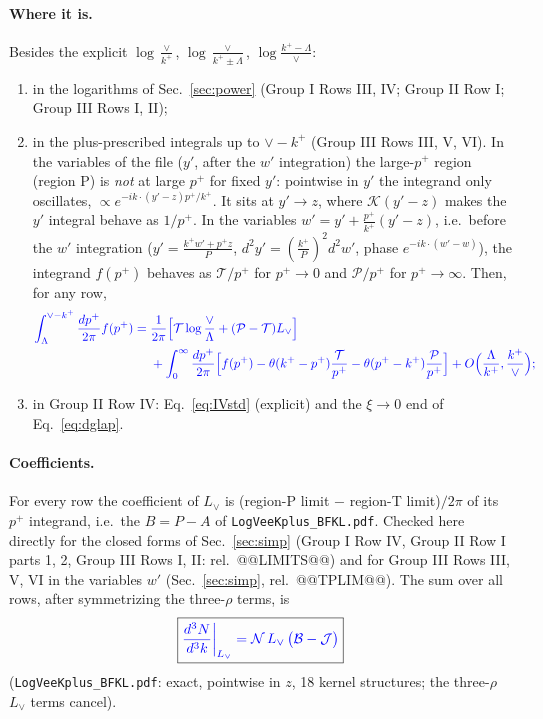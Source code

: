 \documentclass[10pt]{article}
\numberwithin{equation}{section}
\newcommand{\new}[1]{{\color{blue}#1}}
\newcommand{\Lv}{L_{\vee}}
\newcommand{\KK}{\mathcal K}
\newcommand{\JJ}{\mathcal J}
\newcommand{\BB}{\mathcal B}
\newcommand{\NN}{\mathcal N}
\begin{document}
\paragraph{Where it is.} Besides the explicit $\log\frac{\vee}{k^+}$, $\log\frac{\vee}{k^+\pm\Lambda}$, $\log\frac{k^+-\Lambda}{\vee}$:
\begin{enumerate}
\item in the logarithms of Sec.~\ref{sec:power} (Group I Rows III, IV; Group II Row I; Group III Rows I, II);
\item in the plus-prescribed integrals up to $\vee-k^+$ (Group III Rows III, V, VI). In the variables of the file ($y'$, after the $w'$ integration) the large-$p^+$ region (region P) is \emph{not} at large $p^+$ for fixed $y'$: pointwise in $y'$ the integrand only oscillates, $\propto e^{-ik\cdot(y'-z)p^+/k^+}$. It sits at $y'\to z$, where $\KK(y'-z)$ makes the $y'$ integral behave as $1/p^+$. In the variables $w'=y'+\frac{p^+}{k^+}(y'-z)$, i.e.\ before the $w'$ integration ($y'=\frac{k^+w'+p^+z}{P}$, $d^2y'=(\frac{k^+}{P})^2d^2w'$, phase $e^{-ik\cdot(w'-w)}$), the integrand $f(p^+)$ behaves as $\mathcal T/p^+$ for $p^+\to0$ and $\mathcal P/p^+$ for $p^+\to\infty$. Then, for any row,
\begin{equation}
\new{\begin{aligned}\int_\Lambda^{\vee-k^+}\frac{dp^+}{2\pi}f(p^+)={}&\frac{1}{2\pi}\Big[\mathcal T\log\frac{\vee}{\Lambda}+(\mathcal P-\mathcal T)\Lv\Big]\\&+\int_0^{\infty}\frac{dp^+}{2\pi}\Big[f(p^+)-\theta(k^+-p^+)\frac{\mathcal T}{p^+}-\theta(p^+-k^+)\frac{\mathcal P}{p^+}\Big]+O\Big(\frac{\Lambda}{k^+},\frac{k^+}{\vee}\Big);\end{aligned}}
\label{eq:plusrule}
\end{equation}
\item in Group II Row IV: Eq.~\eqref{eq:IVstd} (explicit) and the $\xi\to0$ end of Eq.~\eqref{eq:dglap}.
\end{enumerate}
\paragraph{Coefficients.} For every row the coefficient of $\Lv$ is (region-P limit $-$ region-T limit)$/2\pi$ of its $p^+$ integrand, i.e.\ the $B=P-A$ of \texttt{LogVeeKplus\_BFKL.pdf}. Checked here directly for the closed forms of Sec.~\ref{sec:simp} (Group I Row IV, Group II Row I parts 1, 2, Group III Rows I, II: rel.\ @@LIMITS@@) and for Group III Rows III, V, VI in the variables $w'$ (Sec.~\ref{sec:simp}, rel.\ @@TPLIM@@). The sum over all rows, after symmetrizing the three-$\rho$ terms, is
\begin{equation}
\boxed{\new{\frac{d^3N}{d^3k}\bigg|_{\Lv}=\NN\,\Lv\,\big(\BB-\JJ\big)}}
\label{eq:Lv}
\end{equation}
(\texttt{LogVeeKplus\_BFKL.pdf}: exact, pointwise in $z$, 18 kernel structures; the three-$\rho$ $\Lv$ terms cancel).
\end{document}
